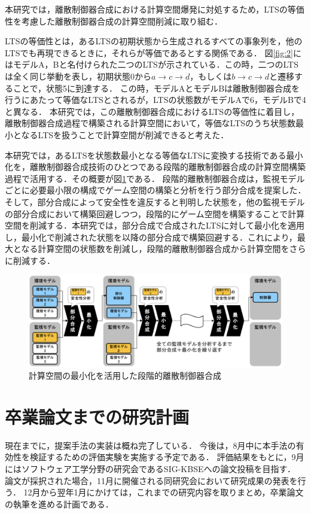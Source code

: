 \documentclass[11pt]{jarticle}
\begin{document}
本研究では，離散制御器合成における計算空間爆発に対処するため，LTSの等価性を考慮した離散制御器合成の計算空間削減に取り組む．

LTSの等価性とは，あるLTSの初期状態から生成されるすべての事象列を，他のLTSでも再現できるときに，それらが等価であるとする関係である．
図\ref{fig:2}にはモデルA，Bと名付けられた二つのLTSが示されている．この時，二つのLTSは全く同じ挙動を表し，初期状態0から$a \rightarrow c \rightarrow d$，もしくは$b \rightarrow c \rightarrow d$と遷移することで，状態5に到達する．
この時，モデルAとモデルBは離散制御器合成を行うにあたって等価なLTSとされるが，LTSの状態数がモデルAで6，モデルBで4と異なる．
本研究では，この離散制御器合成におけるLTSの等価性に着目し，離散制御器合成過程で構築される計算空間において，等価なLTSのうち状態数最小となるLTSを扱うことで計算空間が削減できると考えた．

本研究では，あるLTSを状態数最小となる等価なLTSに変換する技術である最小化を，離散制御器合成技術のひとつである段階的離散制御器合成\cite{yamauchi}の計算空間構築過程で活用する．その概要が図\ref{fig:3}である．
段階的離散制御器合成\cite{yamauchi}は，監視モデルごとに必要最小限の構成でゲーム空間の構築と分析を行う部分合成を提案した．そして，部分合成によって安全性を違反すると判明した状態を，他の監視モデルの部分合成において構築回避しつつ，段階的にゲーム空間を構築することで計算空間を削減する．本研究では，部分合成で合成されたLTSに対して最小化を適用し，最小化で削減された状態を以降の部分合成で構築回避する．これにより，最大となる計算空間の状態数を削減し，段階的離散制御器合成から計算空間をさらに削減する．

\begin{figure}[h]
  \centering
  \includegraphics[width=14.5cm]{./figures/proposal.png}
  \caption{計算空間の最小化を活用した段階的離散制御器合成}
  \label{fig:3}
\end{figure}


\section{卒業論文までの研究計画}
現在までに，提案手法の実装は概ね完了している．
今後は，8月中に本手法の有効性を検証するための評価実験を実施する予定である．
評価結果をもとに，9月にはソフトウェア工学分野の研究会であるSIG-KBSEへの論文投稿を目指す．
論文が採択された場合，11月に開催される同研究会において研究成果の発表を行う．
12月から翌年1月にかけては，これまでの研究内容を取りまとめ，卒業論文の執筆を進める計画である．
\end{document}
